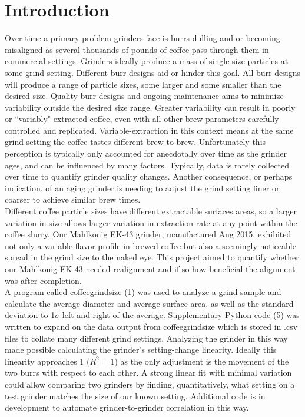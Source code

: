 \documentclass[10pt,a4paper,twocolumn,notitlepage]{article}
\begin{document}
\section{Introduction}
Over time a primary problem grinders face is burrs dulling and or becoming misaligned as several thousands of pounds of coffee pass through them in commercial settings. Grinders ideally produce a mass of single-size particles at some grind setting. Different burr designs aid or hinder this goal. All burr designs will produce a range of particle sizes, some larger and some smaller than the desired size. Quality burr designs and ongoing maintenance aims to minimize variability outside the desired size range. Greater variability can result in poorly or ``variably" extracted coffee, even with all other brew parameters carefully controlled and replicated. Variable-extraction in this context means at the same grind setting the coffee tastes different brew-to-brew. Unfortunately this perception is typically only accounted for anecdotally over time as the grinder ages, and can be influenced by many factors. Typically, data is rarely collected over time to quantify grinder quality changes. Another consequence, or perhaps indication, of an aging grinder is needing to adjust the grind setting finer or coarser to achieve similar brew times.\\

Different coffee particle sizes have different extractable surfaces areas, so a larger variation in size allows larger variation in extraction rate at any point within the coffee slurry. Our Mahlkonig EK-43 grinder, manufactured Aug 2015, exhibited not only a variable flavor profile in brewed coffee but also a seemingly noticeable spread in the grind size to the naked eye. This project aimed to quantify whether our Mahlkonig EK-43 needed realignment and if so how beneficial the alignment was after completion. \\

A program called coffeegrindsize (1) was used to analyze a grind sample and calculate the average diameter and average surface area, as well as the standard deviation to 1$\sigma$ left and right of the average. Supplementary Python code (5) was written to expand on the data output from coffeegrindsize which is stored in .csv files to collate many different grind settings. Analyzing the grinder in this way made possible calculating the grinder's setting-change linearity. Ideally this linearity approaches 1 ($R^2=1$) as the only adjustment is the movement of the two burrs with respect to each other. A strong linear fit with minimal variation could allow comparing two grinders by finding, quantitatively, what setting on a test grinder matches the size of our known setting. Additional code is in development to automate grinder-to-grinder correlation in this way. 
\end{document}
